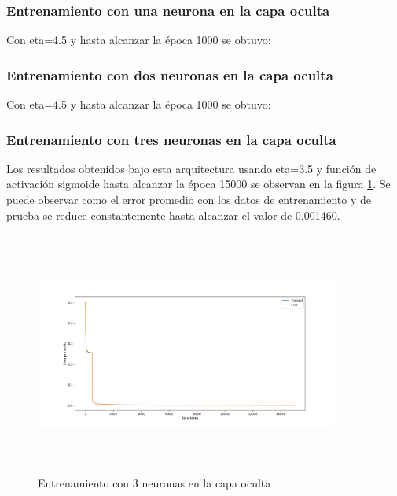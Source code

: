 \documentclass[11pt]{article}
\begin{document}
\subsubsection{Entrenamiento con una neurona en la capa oculta}
Con eta=4.5 y hasta alcanzar la \'epoca 1000 se obtuvo:
\subsubsection{Entrenamiento con dos neuronas en la capa oculta}
Con eta=4.5 y hasta alcanzar la \'epoca 1000 se obtuvo:
\subsubsection{Entrenamiento con tres neuronas en la capa oculta}
Los resultados obtenidos bajo esta arquitectura usando eta=3.5 y funci\'on de activaci\'on sigmoide
hasta alcanzar la \'epoca 15000 se observan en la figura \ref{result_3hn}. Se puede observar como el error promedio con los datos de entrenamiento y de prueba
se reduce constantemente hasta alcanzar el valor de 0.001460.
\begin{figure}[h]
    \includegraphics[width=10cm, height=8cm]{result_3hn}
    \centering
    \caption{Entrenamiento con 3 neuronas en la capa oculta}
    \label{result_3hn}
\end{figure}
\end{document}

